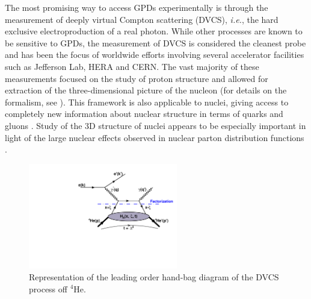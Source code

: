 \documentclass[twocolumn,nofootinbib,showpacs,prl,superscriptaddress,secnumarabic,amssymb,nobibnotes,aps,floatfix]{revtex4}
\begin{document}
The most promising way to access GPDs experimentally is through the measurement 
of deeply virtual Compton scattering (DVCS), \textit{i.e.}, the hard exclusive 
electroproduction of a real photon.  While other processes are known to be 
sensitive to GPDs, the measurement of DVCS is considered the cleanest probe and 
has been the focus of worldwide efforts 
\cite{Stepanyan:2001sm,Airapetian,Chekanov:2003ya,Aktas:2005ty,Chen:2006na,Munoz 
Camacho:2006hx,Girod:2007aa,Mazouz:2007aa,Gavalian:2009,Seder:2015,Pisano:2015,Jo:2015ema} 
involving several accelerator facilities such as Jefferson Lab, HERA and  CERN.  
The vast majority of these measurements focused on the study of proton 
structure and allowed for extraction of the three-dimensional picture of the 
nucleon (for details on the formalism, see 
\cite{Goeke:2001tz,Diehl:2003ny,Ji:2004gf,Belitsky:2005qn,Boffi:2007yc,Guidal:2013rya}).
This framework is also applicable to nuclei, giving access to completely new 
information about nuclear structure in terms of quarks and 
gluons \cite{Dupre:2015jha}.
Study of the 3D structure of nuclei appears to be especially important
in light of the large nuclear effects observed in nuclear parton distribution 
functions \cite{Geesaman:1995yd,Norton:2003cb,Hen:2016kwk}.

\begin{figure}[tb]
\includegraphics[width=6.5cm]{figs/DVCS_diagram.pdf}
\caption{Representation of the leading order hand-bag diagram of the DVCS 
process off $^4$He.}
\label{fig:diags}
\end{figure}
\end{document}
